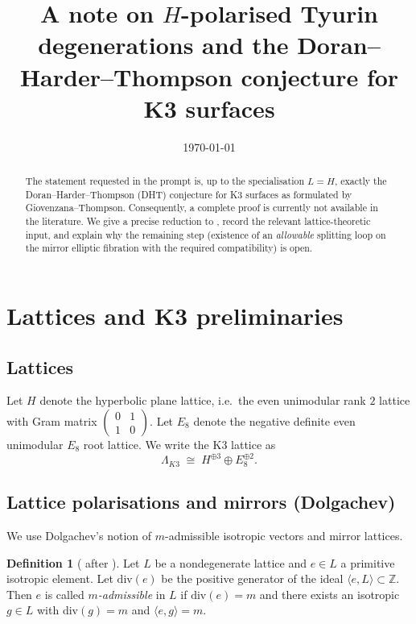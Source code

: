 \documentclass[11pt]{amsart}
\title[A note on $H$-polarised Tyurin degenerations]{A note on $H$-polarised Tyurin degenerations and the Doran--Harder--Thompson conjecture for K3 surfaces}
\date{\today}
\theoremstyle{definition}
\newtheorem{definition}[theorem]{Definition}
\newcommand{\Z}{\mathbb Z}
\begin{document}
\maketitle

\begin{abstract}
The statement requested in the prompt is, up to the specialisation $L=H$, exactly the
Doran--Harder--Thompson (DHT) conjecture for K3 surfaces as formulated by Giovenzana--Thompson.
Consequently, a complete proof is currently not available in the literature. We give a precise
reduction to \cite[Conjecture~5.10]{dfk3slpms}, record the relevant lattice-theoretic input,
and explain why the remaining step (existence of an \emph{allowable} splitting loop on the mirror
elliptic fibration with the required compatibility) is open.
\end{abstract}

\tableofcontents

\section{Lattices and K3 preliminaries}

\subsection{Lattices}
Let $H$ denote the hyperbolic plane lattice, i.e.\ the even unimodular rank $2$ lattice with Gram matrix
$\begin{pmatrix}0&1\\1&0\end{pmatrix}$.
Let $E_8$ denote the negative definite even unimodular $E_8$ root lattice.
We write the K3 lattice as
\[
\Lambda_{K3}\;\cong\; H^{\oplus 3}\oplus E_8^{\oplus 2}.
\]

\subsection{Lattice polarisations and mirrors (Dolgachev)}
We use Dolgachev's notion of $m$-admissible isotropic vectors and mirror lattices.

\begin{definition}[{\cite[Definition~3.30]{dfk3slpms} after \cite[Definition~5.4]{Dol96}}]
Let $L$ be a nondegenerate lattice and $e\in L$ a primitive isotropic element.
Let $\mathrm{div}(e)$ be the positive generator of the ideal $\langle e,L\rangle\subset \Z$.
Then $e$ is called \emph{$m$-admissible} in $L$ if $\mathrm{div}(e)=m$ and there exists an isotropic
$g\in L$ with $\mathrm{div}(g)=m$ and $\langle e,g\rangle=m$.
\end{definition}
\end{document}
